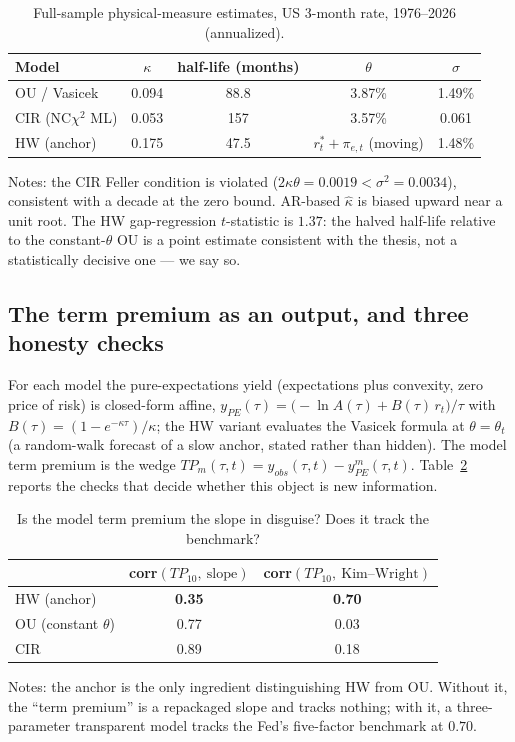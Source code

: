 \documentclass[11pt]{article}
\begin{document}
\begin{table}[t]\centering
\caption{Full-sample physical-measure estimates, US 3-month rate, 1976--2026 (annualized).}
\label{tab:params}
\begin{tabular}{lcccc}
\toprule
Model & $\kappa$ & half-life (months) & $\theta$ & $\sigma$ \\
\midrule
OU / Vasicek & 0.094 & 88.8 & 3.87\% & 1.49\% \\
CIR (NC$\chi^2$ ML) & 0.053 & 157 & 3.57\% & 0.061 \\
HW (anchor) & 0.175 & 47.5 & $r^*_t+\pi_{e,t}$ (moving) & 1.48\% \\
\bottomrule
\end{tabular}
\par\smallskip
\footnotesize Notes: the CIR Feller condition is violated ($2\kappa\theta=0.0019<\sigma^2=0.0034$),
consistent with a decade at the zero bound. AR-based $\hat\kappa$ is biased upward near a
unit root. The HW gap-regression $t$-statistic is $1.37$: the halved half-life relative to
the constant-$\theta$ OU is a point estimate consistent with the thesis, not a
statistically decisive one --- we say so.
\end{table}

\subsection{The term premium as an output, and three honesty checks}

For each model the pure-expectations yield (expectations plus convexity, zero price of
risk) is closed-form affine, $y_{PE}(\tau)=\big(-\ln A(\tau)+B(\tau)\,r_t\big)/\tau$ with
$B(\tau)=(1-e^{-\kappa\tau})/\kappa$; the HW variant evaluates the Vasicek formula at
$\theta=\theta_t$ (a random-walk forecast of a slow anchor, stated rather than hidden). The
model term premium is the wedge $TP_m(\tau,t)=y_{obs}(\tau,t)-y^{m}_{PE}(\tau,t)$.
Table~\ref{tab:honesty} reports the checks that decide whether this object is new
information.

\begin{table}[t]\centering
\caption{Is the model term premium the slope in disguise? Does it track the benchmark?}
\label{tab:honesty}
\begin{tabular}{lcc}
\toprule
 & corr$(TP_{10},\ \text{slope})$ & corr$(TP_{10},\ \text{Kim--Wright})$ \\
\midrule
HW (anchor) & \textbf{0.35} & \textbf{0.70} \\
OU (constant $\theta$) & 0.77 & 0.03 \\
CIR & 0.89 & 0.18 \\
\bottomrule
\end{tabular}
\par\smallskip
\footnotesize Notes: the anchor is the only ingredient distinguishing HW from OU. Without
it, the ``term premium'' is a repackaged slope and tracks nothing; with it, a
three-parameter transparent model tracks the Fed's five-factor benchmark at $0.70$.
\end{table}
\end{document}
